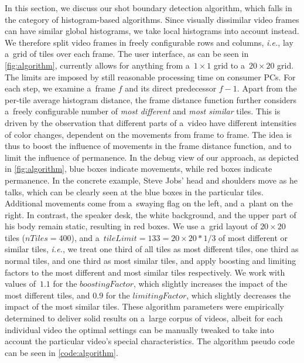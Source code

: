 In this section, we discuss our shot boundary detection algorithm,
which falls in the category of histogram-based algorithms.
Since visually dissimilar video frames
can have similar global histograms,
we take local histograms into account instead. 
We therefore split video frames in freely configurable
rows and columns, \emph{i.e.}, lay a~grid of tiles over each frame.
The user interface, as can be seen in \autoref{fig:algorithm},
currently allows for anything from a~$\mathit{1} \times \mathit{1}$ 
grid to a~$\mathit{20} \times \mathit{20}$ grid.
The limits are imposed by still reasonable processing time on consumer PCs.
For each step, we examine a~frame $\mathit{f}$ and its direct
predecessor $\mathit{f - 1}$.
Apart from the per-tile average histogram distance,
the frame distance function further considers
a~freely configurable number of \emph{most different} and
\emph{most similar} tiles.
This is driven by the observation that different parts
of a~video have different intensities of color changes,
dependent on the movements from frame to frame.
The idea is thus to boost the influence of movements in the frame
distance function, and to limit the influence of permanence.
In the debug view of our approach, as depicted in
\autoref{fig:algorithm}, blue boxes indicate movements,
while red boxes indicate permanence.
In the concrete example, Steve Jobs' head and shoulders move
as he talks, which can be clearly seen
at the blue boxes in the particular tiles.
Additional movements come from a~swaying flag on the left,
and a~plant on the right.
In contrast, the speaker desk, the white background,
and the upper part of his body remain static,
resulting in red boxes.
We use a~grid layout of $\mathit{20} \times \mathit{20}$ tiles
($\mathit{nTiles} = \mathit{400}$), and
a~$\mathit{tileLimit = 133 = \mathit{20} \times \mathit{20} * 1/3}$
of most different or similar tiles,
\emph{i.e.}, we treat one third of all tiles
as most different tiles, one third as normal tiles,
and one third as most similar tiles,
and apply boosting and limiting factors to the most different
and most similar tiles respectively.
We work with values of~$\mathit{1.1}$ for the
$\mathit{boostingFactor}$, which slightly increases
the impact of the most different tiles,
and $\mathit{0.9}$ for the $\mathit{limitingFactor}$,
which slightly decreases the impact of the most similar tiles.
These algorithm parameters were empirically determined
to deliver solid results on a~large corpus of videos,
albeit for each individual video the optimal settings
can be manually tweaked to take into account the
particular video's special characteristics.
The algorithm pseudo code can be seen in \autoref{code:algorithm}.

